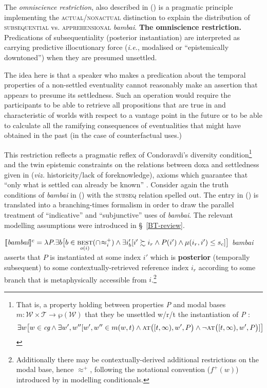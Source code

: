  

The \textit{omniscience restriction}, also described in () is a pragmatic principle implementing the \textsc{actual/nonactual} distinction to explain the distribution of \textsc{subsequential} vs. \textsc{apprehensional} \textit{bambai}.
\pex \textbf{The omniscience restriction.}
Predications of subsequentiality (posterior instantiation) are interpreted as carrying predictive illocutionary force (\textit{i.e.}, modalised or ``epistemically downtoned'') when they are presumed unsettled.
\xe

The idea here is that a speaker who makes a predication about the temporal properties of a non-settled eventuality cannot reasonably make an assertion that appears to presume its settledness.
Such an operation would require the participants to be able to retrieve all propositions that are true in and characteristic of worlds with respect to a vantage point in the future or to be able to calculate all the ramifying consequences of eventualities that might have obtained in the past (in the case of counterfactual uses.)


This restriction reflects a pragmatic reflex of Condoravdi's \citeyearpar[83]{Condoravdi2002}  diversity condition\footnote{That is, a property holding between properties \textit{P} and modal bases $ m:\mathcal{W\times T\to\wp(\mathcal W)} $ that they be unsettled w/r/t the instantiation of \textit{P} \citep[83]{Condoravdi2002}:
$$\exists w\big[w\in\textit{cg}\wedge\exists w',w''[w',w''\in m(w,t)\wedge\textsc{at}\big([t,\infty),w',P\big)\wedge\neg \textsc{at}\big([t,\infty),w',P\big)]\big]$$} and the twin epistemic constraints on the relations between doxa and settledness given in \citealt{Kaufmann2002,Kaufmann2005,Kaufmann2006} (\textit{viz.} historicity/lack of foreknowledge), axioms which guarantee that ``only what is settled can already be known'' \citep[101]{Kaufmann2006}. Consider again the truth conditions of \textit{bambai} in () with the \textsc{subseq} relation spelled out. The entry in () is translated into a branching-times formalism in order to draw the parallel treatment of ``indicative'' and ``subjunctive'' uses of \textit{bambai}. The relevant modelling assumptions were introduced in \S~\ref{BT-review}.

\pex{}
$ \denote[c]{\textit{bambai}}=\lambda\textit{P}.\exists b
\big[b\in\underset{o(i)}{\textsc{best}}(\cap\!\approx_i^+)\wedge \exists i'_b[i'\succsim i_r\wedge P(i')\wedge\mu(i_r,i')\leq s_c]\big] $
\textit{bambai} asserts that $ \mathit P $ is instantiated at some index $ i' $ which is \textbf{posterior} (temporally subsequent) to some contextually-retrieved reference index $ i_r $ according to some branch that is metaphysically accessible from $ i $.\footnote{Additionally there may be contextually-derived additional restrictions on the modal base, hence $ \boldsymbol{\approx^+} $, following the notational convention ($ f^+(w) $) introduced by \citet{Kratzer1981} in modelling conditionals.}

